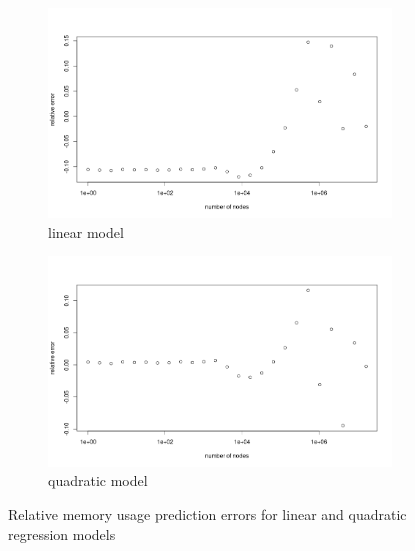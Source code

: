 \documentclass{article}
\begin{document}
\begin{figure}
  \centering
  \begin{subfigure}[t]{0.49\textwidth}
    \centering
    \includegraphics[width=\textwidth]{../io_local_tests/relative_errors_linear.png}
    \caption{linear model}
    \label{fig:linear}
  \end{subfigure}
  \begin{subfigure}[t]{0.49\textwidth}
    \centering
    \includegraphics[width=\textwidth]{../io_local_tests/relative_errors_quadratic.png}
    \caption{quadratic model}
    \label{fig:quadratic}
  \end{subfigure}
  \caption{Relative memory usage prediction errors for linear and quadratic
    regression models}
\end{figure}
\end{document}
